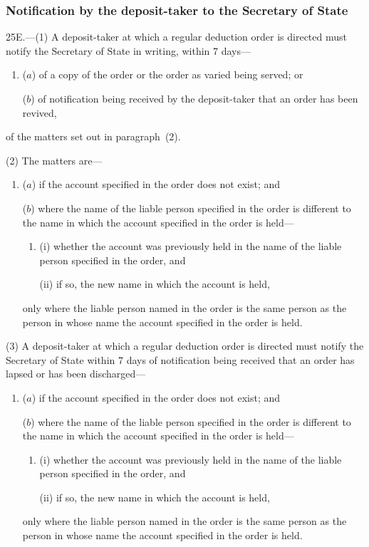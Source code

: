 \documentclass[12pt,a4paper]{article}
\begin{document}
\subsubsection[25E. Notification by the deposit-taker to the 
Secretary of State%
]{Notification by the deposit-taker to the 
Secretary of State%
}

25E.---(1)  A deposit-taker at which a regular deduction order is directed must notify the 
Secretary of State  %
in writing, within 7 days—
\begin{enumerate}\item[]
($a$) of a copy of the order or the order as varied being served; or

($b$) of notification being received by the deposit-taker that an order has been revived,
\end{enumerate}
of the matters set out in paragraph~(2).

(2) The matters are—
\begin{enumerate}\item[]
($a$) if the account specified in the order does not exist; and

($b$) where the name of the liable person specified in the order is different to the name in which the account specified in the order is held—
\begin{enumerate}\item[]
(i) whether the account was previously held in the name of the liable person specified in the order, and

(ii) if so, the new name in which the account is held,
\end{enumerate}
only where the liable person named in the order is the same person as the person in whose name the account specified in the order is held.
\end{enumerate}

(3) A deposit-taker at which a regular deduction order is directed must notify the 
Secretary of State  %
within 7 days of notification being received that an order has lapsed or has been discharged—
\begin{enumerate}\item[]
($a$) if the account specified in the order does not exist; and

($b$) where the name of the liable person specified in the order is different to the name in which the account specified in the order is held—
\begin{enumerate}\item[]
(i) whether the account was previously held in the name of the liable person specified in the order, and

(ii) if so, the new name in which the account is held,
\end{enumerate}
only where the liable person named in the order is the same person as the person in whose name the account specified in the order is held.
\end{enumerate}
\end{document}
